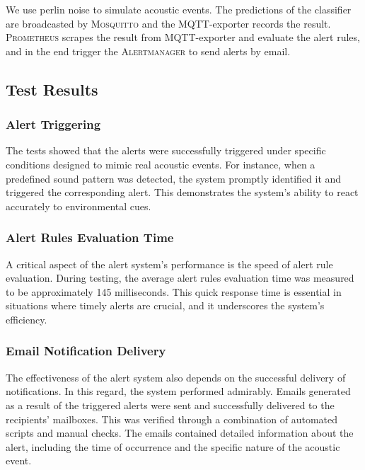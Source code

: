 We use perlin noise to simulate acoustic events. The predictions of the classifier are broadcasted by \textsc{Mosquitto} and the MQTT-exporter records the result. \textsc{Prometheus} scrapes the result from MQTT-exporter and evaluate the alert rules, and in the end trigger the \textsc{Alertmanager} to send alerts by email.

\subsection{Test Results}
\subsubsection{Alert Triggering}
The tests showed that the alerts were successfully triggered under specific conditions designed to mimic real acoustic events. For instance, when a predefined sound pattern was detected, the system promptly identified it and triggered the corresponding alert. This demonstrates the system's ability to react accurately to environmental cues.

\subsubsection{Alert Rules Evaluation Time}

A critical aspect of the alert system's performance is the speed of alert rule evaluation. During testing, the average alert rules evaluation time was measured to be approximately 145 milliseconds. This quick response time is essential in situations where timely alerts are crucial, and it underscores the system's efficiency.


\subsubsection{Email Notification Delivery}
The effectiveness of the alert system also depends on the successful delivery of notifications. In this regard, the system performed admirably. Emails generated as a result of the triggered alerts were sent and successfully delivered to the recipients' mailboxes. This was verified through a combination of automated scripts and manual checks. The emails contained detailed information about the alert, including the time of occurrence and the specific nature of the acoustic event.

